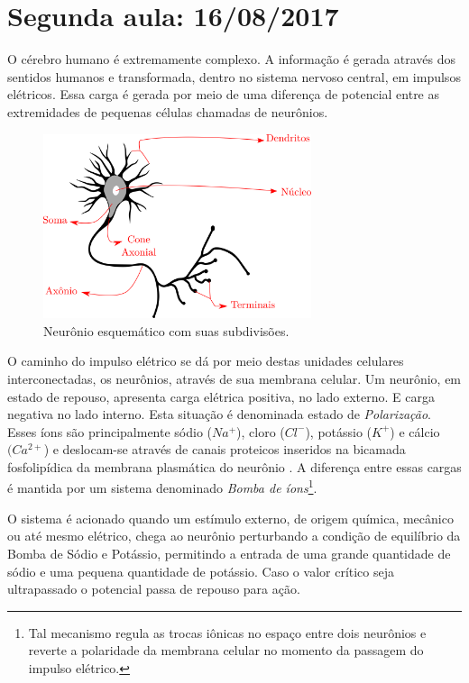 \section{Segunda aula: 16/08/2017}



O cérebro humano é extremamente complexo. A informação é gerada através dos sentidos humanos e transformada, dentro no sistema nervoso central, em impulsos elétricos. Essa carga é gerada por meio de uma diferença de potencial entre as extremidades de pequenas células chamadas de neurônios. 

\begin{figure}[H]
	\centering
	\includegraphics[width=0.7\textwidth]{Imagens/Fig3.png}
	\caption{Neurônio esquemático com suas subdivisões.}
\end{figure}

O caminho do impulso elétrico se dá por meio destas unidades celulares interconectadas, os neurônios, através de sua membrana celular. Um neurônio, em estado de repouso, apresenta carga elétrica positiva, no lado externo. E carga negativa no lado interno. Esta situação é denominada estado de \textit{Polarização}. Esses íons são principalmente sódio ($Na^{+}$), cloro ($Cl^{-}$), potássio ($K^{+}$) e cálcio $(Ca^{2+}$) e deslocam-se através de canais proteicos inseridos na bicamada fosfolipídica da membrana plasmática do neurônio \citep{impulso2016}. A diferença entre essas cargas é mantida por um sistema denominado \textit{Bomba de íons}\footnote{Tal mecanismo regula as trocas iônicas no espaço entre dois neurônios e reverte a polaridade da membrana celular no momento da passagem do impulso elétrico.}.

O sistema é acionado quando um estímulo externo, de origem química, mecânico ou até mesmo elétrico, chega ao neurônio perturbando a condição de equilíbrio da Bomba de Sódio e Potássio, permitindo a entrada de uma grande quantidade de sódio e uma pequena quantidade de potássio. Caso o valor crítico seja ultrapassado o potencial passa de repouso para ação. 

